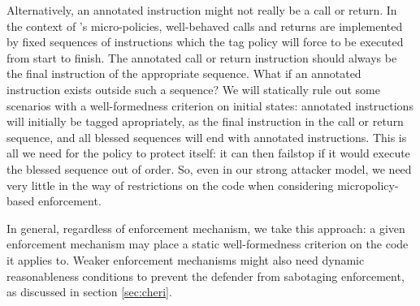 \documentclass[acmsmall,review,anonymous]{acmart}\settopmatter{printfolios=true,printccs=false,printacmref=false}
\begin{document}
Alternatively, an annotated instruction might not really be a call or return.
In the context of \citeauthor{DBLP:conf/sp/RoesslerD18}'s micro-policies, well-behaved calls
and returns are implemented by fixed sequences of instructions which the tag policy
will force to be executed from start to finish. The annotated call or return instruction should always
be the final instruction of the appropriate sequence. What if an annotated instruction exists outside
such a sequence? We will statically rule out some scenarios with a well-formedness criterion
on initial states: annotated instructions will initially be tagged apropriately, as the
final instruction in the call or return sequence, and all blessed sequences will end with
annotated instructions. This is all we need for the policy to
protect itself: it can then failstop if it would execute the blessed sequence out of order.
So, even in our strong attacker model, we need very little in the way of restrictions on
the code when considering micropolicy-based enforcement.  

In general, regardless of enforcement mechanism, we take this approach:
a given enforcement mechanism may place a static well-formedness criterion
on the code it applies to. Weaker enforcement mechanisms might also need dynamic
reasonableness conditions to prevent the defender from sabotaging enforcement, as
discussed in section \ref{sec:cheri}.  

\end{document}
